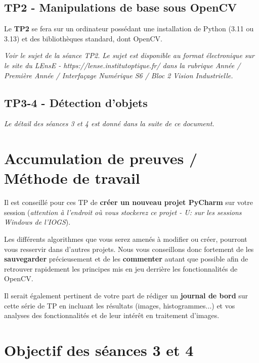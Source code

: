 \documentclass[a4paper,11pt,titlepage]{article} %
\begin{document}
\subsection{TP2 - Manipulations de base sous OpenCV}

Le \textbf{TP2} se fera sur un ordinateur possédant une installation de Python (3.11 ou 3.13) et des bibliothèques standard, dont OpenCV.

\medskip

\textit{Voir le sujet de la séance TP2. Le sujet est disponible au format électronique sur le site du LEnsE - https://lense.institutoptique.fr/ dans la rubrique Année / Première Année / Interfaçage Numérique S6 / Bloc 2 Vision Industrielle.}


\subsection{TP3-4 - Détection d'objets}

\textit{Le détail des séances 3 et 4 est donné dans la suite de ce document.}

\section{Accumulation de preuves / Méthode de travail}

Il est conseillé pour ces TP de \textbf{créer un nouveau projet PyCharm} sur votre session (\textit{attention à l'endroit où vous stockerez ce projet - U: sur les sessions Windows de l'IOGS}).

Les différents algorithmes que vous serez amenés à modifier ou créer, pourront vous resservir dans d'autres projets. Nous vous conseillons donc fortement de les \textbf{sauvegarder} précieusement et de les \textbf{commenter} autant que possible afin de retrouver rapidement les principes mis en jeu derrière les fonctionnalités de OpenCV.

\medskip

Il serait également pertinent de votre part de rédiger un \textbf{journal de bord} sur cette série de TP en incluant les résultats (images, histogrammes...) et vos analyses des fonctionnalités et de leur intérêt en traitement d'images.

\newpage
\pagestyle{empty}



\section{Objectif des séances 3 et 4}
\end{document}
